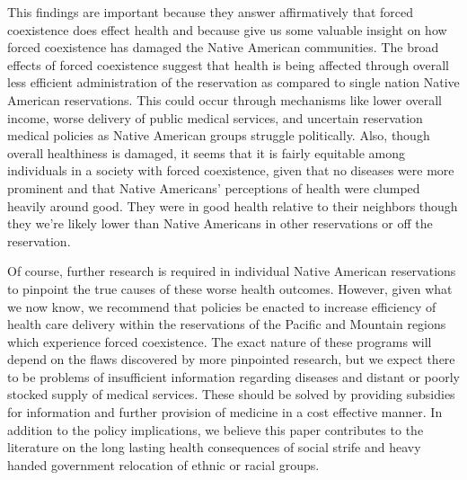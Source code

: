\documentclass[12pt]{article}
\begin{document}
This findings are important because they answer affirmatively that forced coexistence does effect health and because give us some valuable insight on how forced coexistence has damaged the Native American communities. 
The broad effects of forced coexistence suggest that health is being affected through overall less efficient administration of the reservation as compared to single nation Native American reservations.  
This could occur through mechanisms like lower overall income, worse delivery of public medical services, and uncertain reservation medical policies as Native American groups struggle politically. 
Also, though overall healthiness is damaged, it seems that it is fairly equitable among individuals in a society with forced coexistence, given that no diseases were more prominent and that Native Americans’ perceptions of health were clumped heavily around good. 
They were in good health relative to their neighbors though they we’re likely lower than Native Americans in other reservations or off the reservation.  

Of course, further research is required in individual Native American reservations to pinpoint the true causes of these worse health outcomes. 
However, given what we now know, we recommend that policies be enacted to increase efficiency of health care delivery within the reservations of the Pacific and Mountain regions which experience forced coexistence. 
The exact nature of these programs will depend on the flaws discovered by more pinpointed research, but we expect there to be problems of insufficient information regarding diseases and distant or poorly stocked supply of medical services. 
These should be solved by providing subsidies for information and further provision of medicine in a cost effective manner. 
In addition to the policy implications, we believe this paper contributes to the literature on the long lasting health consequences of social strife and heavy handed government relocation of ethnic or racial groups.


\newpage


\end{document}
